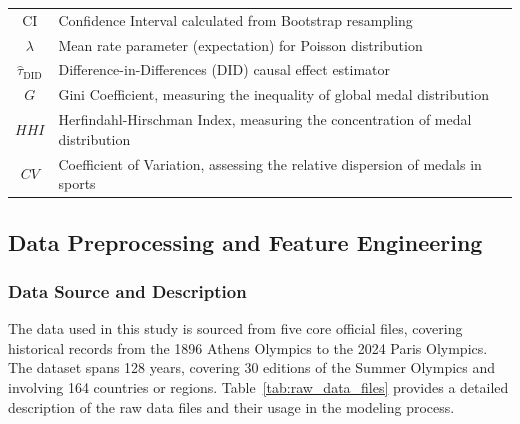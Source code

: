 \documentclass{mcmthesis}
\begin{document}
\begin{table}[htbp]
{\begin{tabular}{cl}
$\text{CI}$ & Confidence Interval calculated from Bootstrap resampling \\
$\lambda$ & Mean rate parameter (expectation) for Poisson distribution \\
$\hat{\tau}_{\text{DID}}$ & Difference-in-Differences (DID) causal effect estimator \\
$G$ & Gini Coefficient, measuring the inequality of global medal distribution \\
$HHI$ & Herfindahl-Hirschman Index, measuring the concentration of medal distribution \\
$CV$ & Coefficient of Variation, assessing the relative dispersion of medals in sports \\

\bottomrule
\end{tabular}
}
\end{table}

\subsection{Data Preprocessing and Feature Engineering}

\subsubsection{Data Source and Description}

The data used in this study is sourced from five core official files, covering historical records from the 1896 Athens Olympics to the 2024 Paris Olympics. The dataset spans 128 years, covering 30 editions of the Summer Olympics and involving 164 countries or regions. Table~\ref{tab:raw_data_files} provides a detailed description of the raw data files and their usage in the modeling process.

\begin{table}[htbp]
\centering
\caption{Description of Raw Data Files}
\label{tab:raw_data_files}
\end{table}
\end{document}
